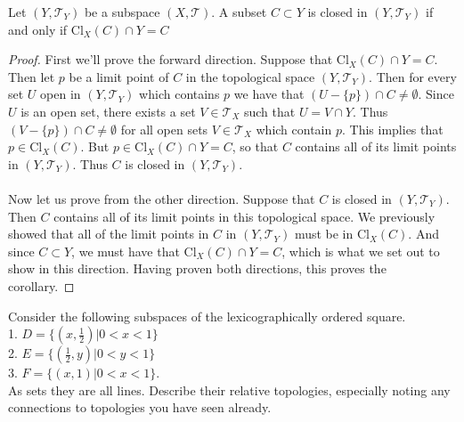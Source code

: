\documentclass[a4paper,12pt,twoside]{hmcpset}
\begin{document}
\begin{problem}[Corollary 4.29] Let $(Y, \mathscr{T}_Y)$ be a subspace
    $(X, \mathscr{T})$. A subset $C \subset Y$ is closed in $(Y,
    \mathscr{T}_Y)$ if and only if $\text{Cl}_X(C) \cap Y = C$
\end{problem}

\begin{proof}
    First we'll prove the forward direction. Suppose that
    $\text{Cl}_X(C) \cap Y = C$. Then let $p$ be a limit point of $C$
    in the topological space $(Y, \mathscr{T}_Y)$. Then for every set
    $U$ open in $(Y, \mathscr{T}_Y)$ which contains $p$ we have that
    $(U -\{p\}) \cap C \ne \emptyset$. Since $U$ is an open set, there
    exists a set $V \in \mathscr{T}_X$ such that $U = V \cap Y$. Thus
    $(V - \{p\}) \cap C \ne \emptyset$ for all
    open sets $V \in \mathscr{T}_X$ which contain $p$. This implies that
    $p \in \text{Cl}_X(C)$. But $p \in \text{Cl}_X(C) \cap Y = C$, so
    that $C$ contains all of its limit points in $(Y, \mathscr{T}_Y)$.
    Thus $C$ is closed in $(Y, \mathscr{T}_Y)$. \\
    \\
    Now let us prove from the other direction. Suppose that $C$ is
    closed in $(Y, \mathscr{T}_Y)$. Then $C$ contains all of its limit
    points in this topological space. We previously showed that all of
    the limit points in $C$ in $(Y, \mathscr{T}_Y)$ must be in
    $\text{Cl}_X(C)$. And since $C \subset Y$, we must have that
    $\text{Cl}_X(C) \cap Y = C$, which is what we set out to show in
    this direction. Having proven both directions, this proves the
    corollary.
\end{proof}

\begin{exercise}[Exercise 4.31]
    Consider the following subspaces of the
lexicographically ordered square.\\
1. $D = \{(x, \frac{1}{2}) | 0 < x < 1\}$\\
2. $E = \{(\frac{1}{2}, y) | 0 < y < 1\}$\\
3. $F = \{(x, 1) | 0 < x < 1\}.$\\
As sets they are all lines. Describe their relative topologies,
especially noting any connections to topologies you have seen already.
\end{exercise}
\end{document}
